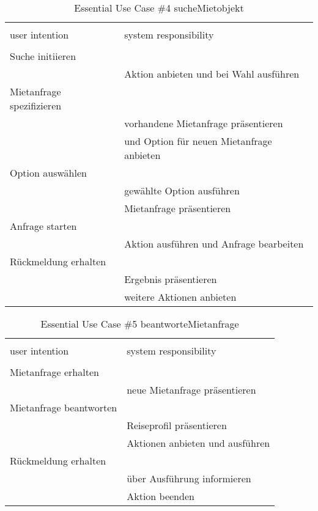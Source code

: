 \begin{table}[H]
\caption{Essential Use Case \#4 sucheMietobjekt }
\centering
\begin{tabular}{l l}
\\ [-0.5ex]

\hline\hline
\\ [-0.5ex]
user intention & system responsibility
\\ [1.5ex]
\hline
\\ [-0.5ex]
Suche initiieren 			& 											 \\[1ex]
							& Aktion anbieten und bei Wahl ausführen	 \\[1ex]
Mietanfrage spezifizieren	& 											 \\[1ex]
							& vorhandene Mietanfrage präsentieren		 \\[1ex]
							& und Option für neuen Mietanfrage anbieten  \\[1ex]
Option auswählen     		& 											 \\[1ex] 
							& gewählte Option ausführen					 \\[1ex]
							& Mietanfrage präsentieren 					 \\[1ex]
Anfrage starten     		& 											 \\[1ex] 
							& Aktion ausführen und Anfrage bearbeiten	 \\[1ex]
Rückmeldung erhalten		& 											 \\[1ex]
							& Ergebnis präsentieren						 \\[1ex]
							& weitere Aktionen anbieten					 \\[1ex]


\hline
\end{tabular}
\label{tab:mietobjekt}
\end{table}


\begin{table}[H]
\caption{Essential Use Case \#5 beantworteMietanfrage }
\centering
\begin{tabular}{l l}
\\ [-0.5ex]

\hline\hline
\\ [-0.5ex]
user intention & system responsibility
\\ [1.5ex]
\hline
\\ [-0.5ex]
Mietanfrage erhalten 		& 											 \\[1ex]
							& neue Mietanfrage präsentieren				 \\[1ex]
Mietanfrage beantworten  	& 											 \\[1ex] 
							& Reiseprofil präsentieren					 \\[1ex]
							& Aktionen anbieten und ausführen			 \\[1ex]
Rückmeldung erhalten		& 											 \\[1ex]
							& über Ausführung informieren				 \\[1ex]
							& Aktion beenden							 \\[1ex]

\hline
\end{tabular}
\label{tab:mietanfrage}
\end{table}



